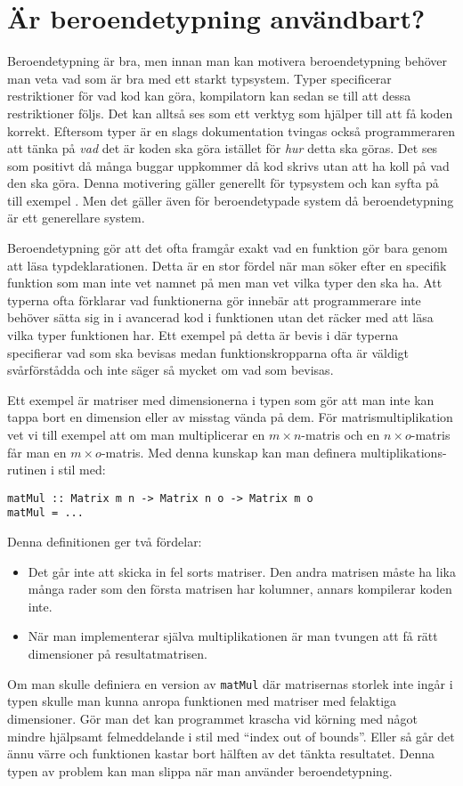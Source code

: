 \section{Är beroendetypning användbart?}
Beroendetypning är bra, men innan man kan motivera beroendetypning behöver man
veta vad som är bra med ett starkt typsystem.
Typer specificerar restriktioner för vad kod kan göra, kompilatorn kan sedan se
till att dessa restriktioner följs. Det kan alltså ses som ett verktyg som
hjälper till att få koden korrekt. Eftersom typer är en slags dokumentation
tvingas också programmeraren att tänka på
\emph{vad} det är koden ska göra istället för \emph{hur} detta ska göras. Det
ses som positivt då många buggar uppkommer då kod skrivs utan att ha koll på
vad den ska göra. Denna motivering gäller generellt för typsystem och kan syfta
på till exempel \haskell{}. Men det gäller även för beroendetypade system då
beroendetypning är ett generellare system.

Beroendetypning gör att det ofta framgår exakt vad en funktion gör bara genom
att läsa typdeklarationen. Detta är en stor fördel när man söker efter en
specifik funktion som man inte vet namnet på men man vet vilka typer den ska
ha. Att typerna ofta förklarar vad funktionerna gör innebär att programmerare
inte behöver sätta sig in i avancerad kod i funktionen utan det räcker med att
läsa vilka typer funktionen har. Ett exempel på detta är bevis i \coq{} där
typerna specifierar vad som ska bevisas medan funktionskropparna ofta är
väldigt svårförstådda och inte säger så mycket om vad som bevisas.

Ett exempel är matriser med dimensionerna i typen som gör att man inte kan
tappa bort en dimension eller av misstag vända på dem. För matrismultiplikation
vet vi till exempel att om man multiplicerar en $m \times n$-matris och en $n
\times o$-matris får man en $m \times o$-matris. Med denna kunskap kan man
definera multiplikations-rutinen i stil med:

\begin{verbatim}
matMul :: Matrix m n -> Matrix n o -> Matrix m o
matMul = ...
\end{verbatim}

Denna definitionen ger två fördelar:

\begin{itemize}
  \item Det går inte att skicka in fel sorts matriser. Den andra matrisen måste
    ha lika många rader som den första matrisen har kolumner, annars kompilerar
    koden inte.
  \item När man implementerar själva multiplikationen är man tvungen att få rätt
    dimensioner på resultatmatrisen.
\end{itemize}

Om man skulle definiera en version av \verb+matMul+ där matrisernas storlek
inte ingår i typen skulle man kunna anropa funktionen med matriser med
felaktiga dimensioner. Gör man det kan programmet krascha vid körning med något
mindre hjälpsamt felmeddelande i stil med ``index out of bounds''. Eller så går
det ännu värre och funktionen kastar bort hälften av det tänkta resultatet.
Denna typen av problem kan man slippa när man använder beroendetypning.
